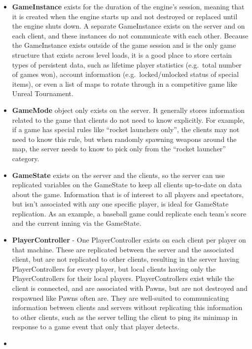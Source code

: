 \documentclass[
  letterpaper,
  DIV=11,
  numbers=noendperiod]{scrartcl}
\begin{document}
\begin{itemize}
\item
  \textbf{GameInstance} exists for the duration of the engine's session,
  meaning that it is created when the engine starts up and not destroyed
  or replaced until the engine shuts down. A separate GameInstance
  exists on the server and on each client, and these instances do not
  communicate with each other. Because the GameInstance exists outside
  of the game session and is the only game structure that exists across
  level loads, it is a good place to store certain types of persistent
  data, such as lifetime player statistics (e.g.~total number of games
  won), account information (e.g.~locked/unlocked status of special
  items), or even a list of maps to rotate through in a competitive game
  like Unreal Tournament.
\item
  \textbf{GameMode} object only exists on the server. It generally
  stores information related to the game that clients do not need to
  know explicitly. For example, if a game has special rules like
  ``rocket launchers only'', the clients may not need to know this rule,
  but when randomly spawning weapons around the map, the server needs to
  know to pick only from the ``rocket launcher'' category.
\item
  \textbf{GameState} exists on the server and the clients, so the server
  can use replicated variables on the GameState to keep all clients
  up-to-date on data about the game. Information that is of interest to
  all players and spectators, but isn't associated with any one specific
  player, is ideal for GameState replication. As an example, a baseball
  game could replicate each team's score and the current inning via the
  GameState.
\item
  \textbf{PlayerController} - One PlayerController exists on each client
  per player on that machine. These are replicated between the server
  and the associated client, but are not replicated to other clients,
  resulting in the server having PlayerControllers for every player, but
  local clients having only the PlayerControllers for their local
  players. PlayerControllers exist while the client is connected, and
  are associated with Pawns, but are not destroyed and respawned like
  Pawns often are. They are well-suited to communicating information
  between clients and servers without replicating this information to
  other clients, such as the server telling the client to ping its
  minimap in response to a game event that only that player detects.
\item

\end{itemize}
\end{document}
